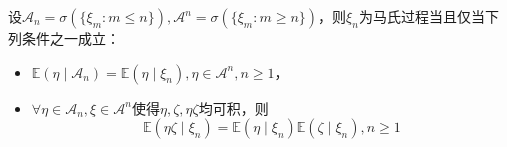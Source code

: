 \documentclass{ctexart}
\begin{document}
\begin{problem}\label{pro:13}
  设\(\mathcal{A}_n=\sigma(\{\xi_m:m \leq n\}),\mathcal{A}^n=\sigma(\{\xi_m:m \geq n\}) \)，则\(\xi_n \)为马氏过程当且仅当下列条件之一成立：
  \begin{itemize}
    \item \(\mathbb{E}(\eta \mid \mathcal{A}_n)=\mathbb{E}(\eta \mid \xi_n),\eta \in \mathcal{A}^n, n \geq 1 \)，
    \item \(\forall \eta \in \mathcal{A}_n,\xi \in \mathcal{A}^n \)使得\(\eta , \zeta ,\eta \zeta \)均可积，则\[
        \mathbb{E}(\eta \zeta \mid \xi_n)=\mathbb{E}(\eta \mid \xi_n)\mathbb{E}(\zeta \mid \xi_n),n \geq 1
      \]
  \end{itemize}

\end{problem}
\end{document}
